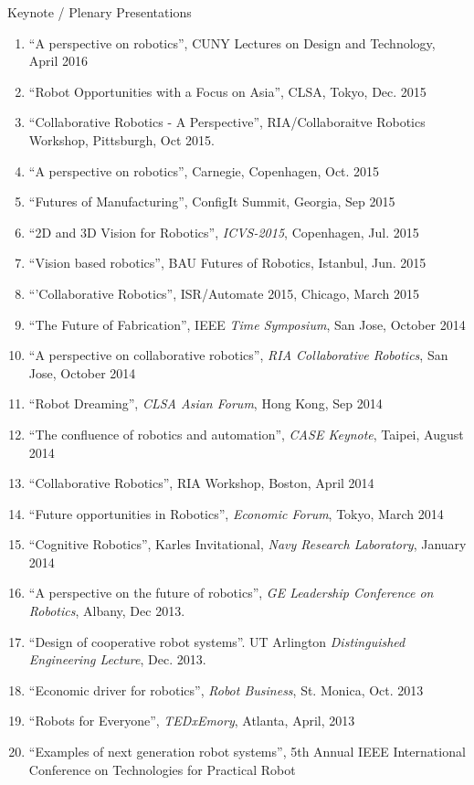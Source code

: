\documentclass{article}
\begin{document}
\begin{cv}
\begin{cvlist}{Keynote / Plenary Presentations}
\begin{enumerate}
  \item ``A perspective on robotics'', CUNY Lectures on Design and Technology, April 2016
  \item ``Robot Opportunities with a Focus on Asia'', CLSA, Tokyo,  Dec. 2015
  \item ``Collaborative Robotics - A Perspective'', RIA/Collaboraitve Robotics Workshop, Pittsburgh, Oct 2015.
  \item ``A perspective on robotics'', Carnegie, Copenhagen, Oct. 2015
  \item ``Futures of Manufacturing'', ConfigIt Summit, Georgia, Sep 2015
  \item ``2D and 3D Vision for Robotics'', {\em ICVS-2015}, Copenhagen, Jul. 2015
  \item ``Vision based robotics'', BAU Futures of Robotics, Istanbul, Jun. 2015
  \item ``'Collaborative Robotics'', ISR/Automate 2015, Chicago, March 2015
  \item ``The Future of Fabrication'', IEEE {\em Time Symposium}, San Jose, October 2014
  \item ``A perspective on collaborative robotics'', {\em RIA Collaborative Robotics}, San Jose, October 2014
  \item ``Robot Dreaming'', {\em CLSA Asian Forum}, Hong Kong, Sep 2014
  \item ``The confluence of robotics and automation'', {\em CASE Keynote}, Taipei, August 2014
  \item ``Collaborative Robotics'', RIA Workshop, Boston, April 2014
  \item ``Future opportunities in Robotics'', {\em Economic Forum}, Tokyo, March 2014
  \item ``Cognitive Robotics'', Karles Invitational, {\em Navy Research Laboratory}, January 2014
  \item ``A perspective on the future of robotics'', {\em GE Leadership Conference on Robotics}, Albany, Dec 2013.
  \item ``Design of cooperative robot systems''. UT Arlington {\em Distinguished Engineering Lecture}, Dec. 2013.
  \item ``Economic driver for robotics'', {\em Robot Business}, St. Monica,  Oct. 2013
  \item ``Robots for Everyone'', {\em TEDxEmory}, Atlanta, April, 2013
  \item ``Examples of next generation robot systems'', 5th Annual IEEE
    International Conference on Technologies for Practical Robot

\end{enumerate}
\end{cvlist}
\end{cv}
\end{document}
